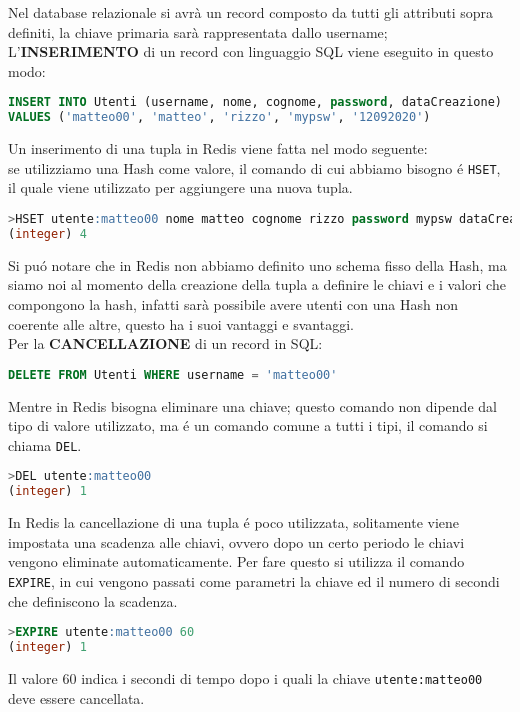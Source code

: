 Nel database relazionale si avrà un record composto da tutti gli attributi sopra definiti, la chiave primaria sarà rappresentata dallo username;\\

L'\textbf{INSERIMENTO} di un record con linguaggio SQL viene eseguito in questo modo:
\begin{lstlisting}[autogobble, style=redis-cli, language=SQL]
INSERT INTO Utenti (username, nome, cognome, password, dataCreazione)
VALUES ('matteo00', 'matteo', 'rizzo', 'mypsw', '12092020')\end{lstlisting}

Un inserimento di una tupla in Redis viene fatta nel modo seguente:\\
se utilizziamo una Hash come valore, il comando di cui abbiamo bisogno é \texttt{HSET}, il quale viene utilizzato per aggiungere una nuova tupla.
\begin{lstlisting}[autogobble, style=redis-cli, language=SQL]
>HSET utente:matteo00 nome matteo cognome rizzo password mypsw dataCreazione 12092020
(integer) 4\end{lstlisting}

Si puó notare che in Redis non abbiamo definito uno schema fisso della Hash, ma siamo noi al momento della creazione della tupla a definire le chiavi e i valori che compongono la hash,
infatti sarà possibile avere utenti con una Hash non coerente alle altre, questo ha i suoi vantaggi e svantaggi.\\

Per la \textbf{CANCELLAZIONE} di un record in SQL:
\begin{lstlisting}[autogobble, style=redis-cli, language=SQL]
DELETE FROM Utenti WHERE username = 'matteo00'\end{lstlisting}

Mentre in Redis bisogna eliminare una chiave; questo comando non dipende dal tipo di valore utilizzato, ma é un comando comune
a tutti i tipi, il comando si chiama \texttt{DEL}.

\begin{lstlisting}[autogobble, style=redis-cli, language=SQL]
>DEL utente:matteo00
(integer) 1\end{lstlisting}

In Redis la cancellazione di una tupla é poco utilizzata, solitamente viene impostata una scadenza alle chiavi, ovvero dopo un certo periodo le chiavi vengono eliminate automaticamente.
Per fare questo si utilizza il comando \texttt{EXPIRE}, in cui vengono passati come parametri la chiave ed il numero di secondi che definiscono la scadenza.
\begin{lstlisting}[autogobble, style=redis-cli, language=SQL]
>EXPIRE utente:matteo00 60
(integer) 1\end{lstlisting}
Il valore 60 indica i secondi di tempo dopo i quali la chiave \texttt{utente:matteo00} deve essere cancellata.\\
 \\


